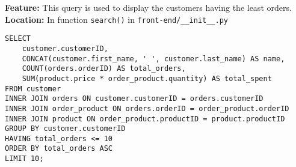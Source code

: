 \textbf{Feature:} This query is used to display the customers having the least orders. \\
\textbf{Location:} In function \texttt{search()} in \texttt{front-end/\_\_init\_\_.py}

\begin{lstlisting}
SELECT
    customer.customerID,
    CONCAT(customer.first_name, ' ', customer.last_name) AS name,
    COUNT(orders.orderID) AS total_orders,
    SUM(product.price * order_product.quantity) AS total_spent
FROM customer
INNER JOIN orders ON customer.customerID = orders.customerID
INNER JOIN order_product ON orders.orderID = order_product.orderID
INNER JOIN product ON order_product.productID = product.productID
GROUP BY customer.customerID
HAVING total_orders <= 10
ORDER BY total_orders ASC
LIMIT 10;
\end{lstlisting}